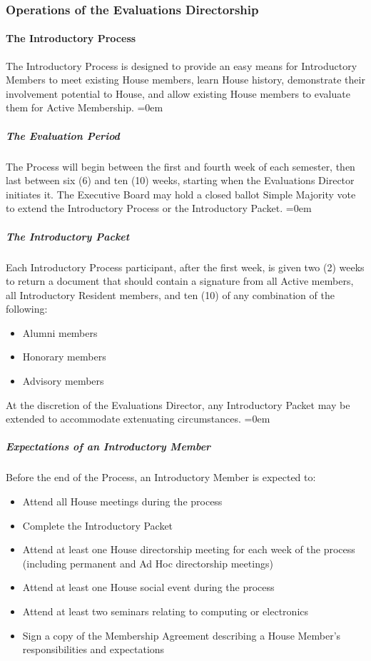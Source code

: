 \documentclass{article}
\newcommand{\asubsection}[1]{\subsubsection{#1} \label{#1}}
\newcommand{\asubsubsection}[1]{\paragraph{#1} \label{#1}}
\newcommand{\asubsubsubsection}[1]{\parindent=0em\subparagraph{#1} \label{#1}}
\begin{document}
\asubsection{Operations of the Evaluations Directorship}
\asubsubsection{The Introductory Process}
The Introductory Process is designed to provide an easy means for Introductory Members to meet existing House members, learn House history, demonstrate their involvement potential to House, and allow existing House members to evaluate them for Active Membership.
\asubsubsubsection{The Evaluation Period}
The Process will begin between the first and fourth week of each semester, then last between six (6) and ten (10) weeks, starting when the Evaluations Director initiates it.
The Executive Board may hold a closed ballot Simple Majority vote to extend the Introductory Process or the Introductory Packet.
\asubsubsubsection{The Introductory Packet}
Each Introductory Process participant, after the first week, is given two (2) weeks to return a document that should contain a signature from all Active members, all Introductory Resident members, and ten (10) of any combination of the following:
\begin{itemize}
	\item Alumni members
	\item Honorary members
	\item Advisory members
\end{itemize}
At the discretion of the Evaluations Director, any Introductory Packet may be extended to accommodate extenuating circumstances.
\asubsubsubsection{Expectations of an Introductory Member}
Before the end of the Process, an Introductory Member is expected to:
\begin{itemize}
\item Attend all House meetings during the process
\item Complete the Introductory Packet
\item Attend at least one House directorship meeting for each week of the process (including permanent and Ad Hoc directorship meetings)
\item Attend at least one House social event during the process
\item Attend at least two seminars relating to computing or electronics
\item Sign a copy of the Membership Agreement describing a House Member’s responsibilities and expectations
\end{itemize}
\end{document}
